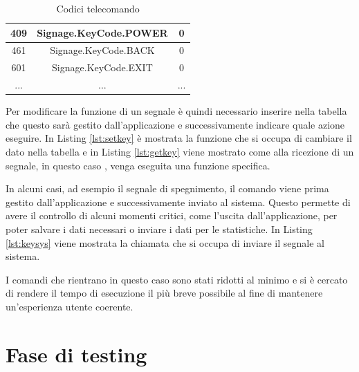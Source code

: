 \begin{table}
    \centering
    \begin{tabular}{ |c|c|c| } 
         \hline
         409 & Signage.KeyCode.POWER & 0 \\  
         \hline
         461 & Signage.KeyCode.BACK & 0 \\  
         \hline
         601 & Signage.KeyCode.EXIT & 0 \\  
         \hline
         ... & ... & ...\\
         \hline
    \end{tabular}
    \caption{Codici telecomando} \label{tab:keycode}
\end{table}
    
Per modificare la funzione di un segnale è quindi necessario inserire nella tabella che questo sarà gestito dall'applicazione e successivamente indicare quale azione eseguire. In Listing \ref*{lst:setkey} è mostrata la funzione che si occupa di cambiare il dato nella tabella e in Listing \ref*{lst:getkey} viene mostrato come alla ricezione di un segnale, in questo caso , venga eseguita una funzione specifica.




In alcuni casi, ad esempio il segnale di spegnimento, il comando viene prima gestito dall'applicazione e successivamente inviato al sistema. Questo permette di avere il controllo di alcuni momenti critici, come l'uscita dall'applicazione, per poter salvare i dati necessari o inviare i dati per le statistiche.
In Listing \ref*{lst:keysys} viene mostrata la chiamata che si occupa di inviare il segnale al sistema.



I comandi che rientrano in questo caso sono stati ridotti al minimo e si è cercato di rendere il tempo di esecuzione il più breve possibile al fine di mantenere un'esperienza utente coerente.

\section{Fase di testing}

